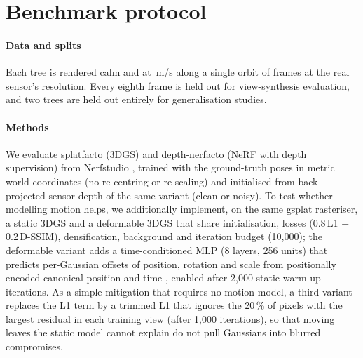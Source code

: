 \documentclass[preprint,11pt,authoryear]{elsarticle}
\begin{document}
\begin{table}[t]
\centering\small
\caption{Automatic validation over all released sequences.}
\label{tab:validation}
\resizebox{\linewidth}{!}{}
\end{table}

\section{Benchmark protocol}\label{sec:protocol}
\paragraph{Data and splits} Each tree is rendered calm and at \WindLevels\,m/s along a single orbit of \NFrames{} frames at the real sensor's resolution. Every eighth frame is held out for view-synthesis evaluation, and two trees are held out entirely for generalisation studies.

\paragraph{Methods} We evaluate splatfacto (3DGS) and depth-nerfacto (NeRF with depth supervision) from Nerfstudio \citep{tancik2023nerfstudio}, trained with the ground-truth poses in metric world coordinates (no re-centring or re-scaling) and initialised from back-projected sensor depth of the same variant (clean or noisy). To test whether modelling motion helps, we additionally implement, on the same gsplat rasteriser, a static 3DGS and a deformable 3DGS that share initialisation, losses (0.8\,L1 + 0.2\,D-SSIM), densification, background and iteration budget (10{,}000); the deformable variant adds a time-conditioned MLP (8 layers, 256 units) that predicts per-Gaussian offsets of position, rotation and scale from positionally encoded canonical position and time \citep{yang2024deformable}, enabled after 2{,}000 static warm-up iterations. As a simple mitigation that requires no motion model, a third variant replaces the L1 term by a trimmed L1 that ignores the 20\,\% of pixels with the largest residual in each training view (after 1{,}000 iterations), so that moving leaves the static model cannot explain do not pull Gaussians into blurred compromises.
\end{document}
